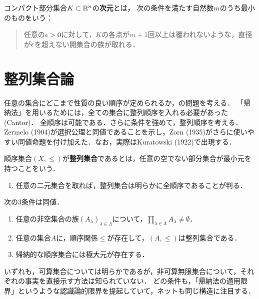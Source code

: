 \documentclass[uplatex,dvipdfmx]{jsreport}
\begin{document}
\begin{definition}
    コンパクト部分集合$K\subset\mathbb{R}^n$の\textbf{次元}とは，
    次の条件を満たす自然数$m$のうち最小のものをいう：
    \begin{quote}
        任意の$\epsilon>0$に対して，$K$の各点が$m+1$回以上は覆われないような，直径が$\epsilon$を超えない開集合の族が取れる．
    \end{quote}
\end{definition}

\section{整列集合論}

\begin{tcolorbox}[colframe=ForestGreen, colback=ForestGreen!10!white,breakable,colbacktitle=ForestGreen!40!white,coltitle=black,fonttitle=\bfseries\sffamily,
title=]
    任意の集合にどこまで性質の良い順序が定められるか，の問題を考える．
    「帰納法」を用いるためには，全ての集合に整列順序を入れる必要があった(Cantor)．
    全順序は可能である．さらに条件を強めて，整列順序を考える．
    Zermelo (1904)が選択公理と同値であることを示し，Zorn (1935)がさらに使いやすい同値命題を付け加えた．なお，実際はKuratowski (1922)で出現する．
\end{tcolorbox}

\begin{definition}
    順序集合$(X,\le)$が\textbf{整列集合}であるとは，任意の空でない部分集合が最小元を持つことをいう．
    \begin{enumerate}
        \item 任意の二元集合を取れば，整列集合は明らかに全順序であることが判る．
    \end{enumerate}
\end{definition}

\begin{theorem}
    次の3条件は同値．
    \begin{enumerate}
        \item 任意の非空集合の族$(A_\lambda)_{\lambda\in\Lambda}$について，$\prod_{\lambda\in\Lambda}A_\lambda\ne\emptyset$．
        \item 任意の集合$A$に，順序関係$\le$が存在して，$(A,\le)$は整列集合である．
        \item 帰納的な順序集合には極大元が存在する．
    \end{enumerate}
\end{theorem}
\begin{remarks}
    いずれも，可算集合については明らかであるが，非可算無限集合について，それぞれの事実を直接示す方法は知られていない．
    どの条件も，「帰納法の適用限界」というような認識論的限界を提起していて，ネットも同じ構造に注目する．
\end{remarks}
\end{document}
